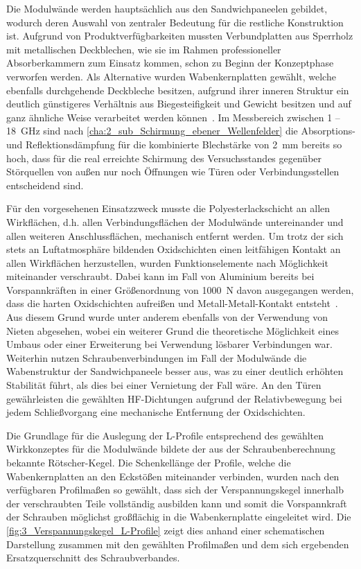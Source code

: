 Die Modulwände werden hauptsächlich aus den Sandwichpaneelen gebildet, wodurch deren Auswahl von zentraler Bedeutung für die restliche Konstruktion ist. Aufgrund von Produktverfügbarkeiten mussten Verbundplatten aus Sperrholz mit metallischen Deckblechen, wie sie im Rahmen professioneller Absorberkammern zum Einsatz kommen, schon zu Beginn der Konzeptphase verworfen werden. Als Alternative wurden Wabenkernplatten gewählt, welche ebenfalls durchgehende Deckbleche besitzen, aufgrund ihrer inneren Struktur ein deutlich günstigeres Verhältnis aus Biegesteifigkeit und Gewicht besitzen und auf ganz ähnliche Weise verarbeitet werden können~\cite{Alucore-Datenblatt}. Im Messbereich zwischen 1 -- \SI{18}{\giga\hertz} sind nach \Abschnitt\ref{cha:2_sub_Schirmung_ebener_Wellenfelder} die Absorptions- und Reflektionsdämpfung für die kombinierte Blechstärke von \SI{2}{\milli\meter} bereits so hoch, dass für die real erreichte Schirmung des Versuchsstandes gegenüber Störquellen von außen nur noch Öffnungen wie Türen oder Verbindungsstellen entscheidend sind.  
\par
\vspace{\linespace}
Für den vorgesehenen Einsatzzweck musste die Polyesterlackschicht an allen Wirkflächen, d.h. allen Verbindungsflächen der Modulwände untereinander und allen weiteren Anschlussflächen, mechanisch entfernt werden. Um trotz der sich stets an Luftatmosphäre bildenden Oxidschichten einen leitfähigen Kontakt an allen Wirkflächen herzustellen, wurden Funktionselemente nach Möglichkeit miteinander verschraubt. Dabei kann im Fall von Aluminium bereits bei Vorspannkräften in einer Größenordnung von \SI{1000}{\newton} davon ausgegangen werden, dass die harten Oxidschichten aufreißen und Metall-Metall-Kontakt entsteht~\cite{Projektarbeit}. Aus diesem Grund wurde unter anderem ebenfalls von der Verwendung von Nieten abgesehen, wobei ein weiterer Grund die theoretische Möglichkeit eines Umbaus oder einer Erweiterung bei Verwendung lösbarer Verbindungen war. Weiterhin nutzen Schraubenverbindungen im Fall der Modulwände die Wabenstruktur der Sandwichpaneele besser aus, was zu einer deutlich erhöhten Stabilität führt, als dies bei einer Vernietung der Fall wäre. An den Türen gewährleisten die gewählten HF-Dichtungen aufgrund der Relativbewegung bei jedem Schließvorgang eine mechanische Entfernung der Oxidschichten.
\par
\vspace{\linespace}
Die Grundlage für die Auslegung der L-Profile entsprechend des gewählten Wirkkonzeptes für die Modulwände bildete der aus der Schraubenberechnung bekannte Rötscher-Kegel. Die Schenkellänge der Profile, welche die Wabenkernplatten an den Eckstößen miteinander verbinden, wurden nach den verfügbaren Profilmaßen so gewählt, dass sich der Verspannungskegel innerhalb der verschraubten Teile vollständig ausbilden kann und somit die Vorspannkraft der Schrauben möglichst großflächig in die Wabenkernplatte eingeleitet wird. Die \Abb\ref{fig:3_Verspannungskegel_L-Profile} zeigt dies anhand einer schematischen Darstellung zusammen mit den gewählten Profilmaßen und dem sich ergebenden Ersatzquerschnitt des Schraubverbandes. 
\par
\vspace{\linespace}


